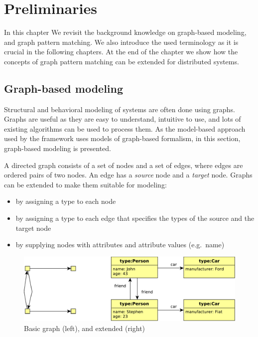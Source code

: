 
\chapter{Preliminaries}

In this chapter We revisit the background knowledge on graph-based modeling, and graph pattern matching. We also introduce the used terminology as it is crucial in the following chapters. At the end of the chapter we show how the concepts of graph pattern matching can be extended for distributed systems.

\section{Graph-based modeling}

Structural and behavioral modeling of systems are often done using graphs. 
Graphs are useful as they are easy to understand, intuitive to use, and lots of existing algorithms can be used to process them. 
As the model-based approach used by the framework uses models of graph-based formalism, in this section, graph-based modeling is presented.

A directed graph consists of a set of nodes and a set of edges, where edges are ordered pairs of two nodes. An edge has a \emph{source} node and a \emph{target} node. 
Graphs can be extended to make them suitable for modeling:

\begin{itemize}
	\item by assigning a type to each node
	\item by assigning a type to each edge that specifies the types of the source and the target node
	\item by supplying nodes with attributes and attribute values (e.g.\ name)
\end{itemize}


\begin{figure}[H]
	\begin{center}
		\includegraphics[width=\textwidth]{figures/graphs.pdf}
		\caption{Basic graph (left), and extended (right) }
		\label{fig:graphs}
	\end{center}
\end{figure}

